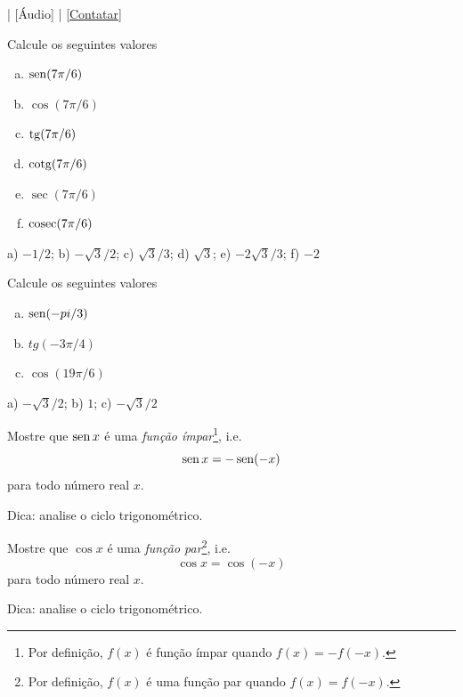 \begin{flushright}
  [Vídeo] | [Áudio] | \href{https://phkonzen.github.io/notas/contato.html}{[Contatar]}
\end{flushright}

\begin{exer}
  Calcule os seguintes valores
  \begin{enumerate}[a)]
  \item $\operatorname{sen}(7\pi/6)$
  \item $\cos(7\pi/6)$
  \item $\operatorname{tg}(7\pi/6)$
  \item $\operatorname{cotg}(7\pi/6)$
  \item $\sec(7\pi/6)$
  \item $\operatorname{cosec}(7\pi/6)$
  \end{enumerate}
\end{exer}
\begin{resp}
  a) $-1/2$; b) $-\sqrt{3}/2$; c) $\sqrt{3}/3$; d) $\sqrt{3}$; e) $-2\sqrt{3}/3$; f) $-2$
\end{resp}

\begin{exer}
  Calcule os seguintes valores
  \begin{enumerate}[a)]
  \item $\operatorname{sen}(-pi/3)$
  \item $tg(-3\pi/4)$
  \item $\cos(19\pi/6)$
  \end{enumerate}
\end{exer}
\begin{resp}
  a) $-\sqrt{3}/2$; b) $1$; c) $-\sqrt{3}/2$
\end{resp}

\begin{exer}
  Mostre que $\operatorname{sen} x$ é  uma \emph{função ímpar}\footnote{Por definição, $f(x)$ é função ímpar quando $f(x)=-f(-x)$.}, i.e.
  \begin{equation}
    \operatorname{sen} x = -\operatorname{sen}(-x)
  \end{equation}
  para todo número real $x$.
\end{exer}
\begin{resp}
  Dica: analise o ciclo trigonométrico.
\end{resp}

\begin{exer}
  Mostre que $\cos x$ é  uma \emph{função par}\footnote{Por definição, $f(x)$ é uma função par quando $f(x)=f(-x)$.}, i.e.
  \begin{equation}
    \cos x = \cos(-x)
  \end{equation}
  para todo número real $x$.
\end{exer}
\begin{resp}
  Dica: analise o ciclo trigonométrico.
\end{resp}

